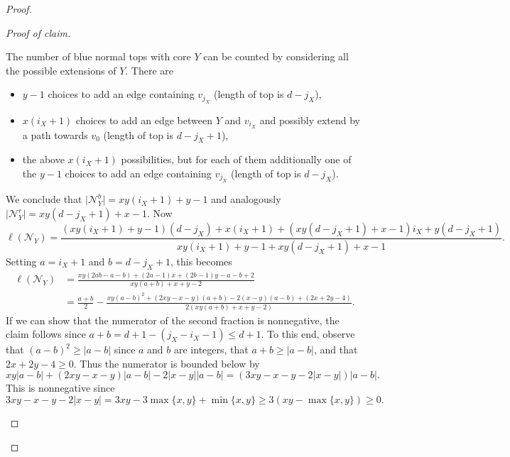 \documentclass[11pt]{article}
\theoremstyle{definition}
\newcommand{\ny}{\mathcal N_{Y}}
\newcommand*{\abs}[1]{\lvert #1\rvert}
\newenvironment{poc}{\begin{proof}[Proof of claim]\renewcommand*{\qedsymbol}{$\blacksquare$}}{\end{proof}}
\begin{document}
\begin{proof}
\begin{poc}
\begin{itemize}
            The number of blue normal tops with core $Y$ can be counted by considering all the possible extensions of $Y$. There are 
            \begin{itemize}
                \item $y-1$ choices to add an edge containing $v_{j_X}$ (length of top is $d-j_X$),
                \item $x(i_X+1)$ choices to add an edge between $Y$ and $v_{i_X}$ and possibly extend by a path towards $v_0$ (length of top is $d-j_X+1$),
                \item the above $x(i_X+1)$ possibilities, but for each of them additionally one of the $y-1$ choices to add an edge containing $v_{j_X}$ (length of top is $d-j_X$).
            \end{itemize}
            We conclude that $\abs{\ny^b}=xy(i_X+1)+y-1$ and analogously $\abs{\ny^r}=xy(d-j_X+1)+x-1$.
            Now
            $$\ell(\ny) = \frac{(xy(i_X+1)+y-1)(d-j_X)+x(i_X+1)+ (xy(d-j_X+1)+x-1)i_X+y(d-j_X+1) }{xy(i_X+1)+y-1+xy(d-j_X+1)+x-1}.$$
            Setting $a = i_X+1$ and $b = d-j_X+1$, this becomes
        \begin{align*}
        \ell(\ny) &= \frac{xy(2ab-a-b)+(2a-1)x+(2b-1)y-a-b+2}{xy(a+b)+x+y-2} \\
        &= \frac{a+b}{2} - \frac{xy(a-b)^2 + (2xy-x-y)(a+b)-2(x-y)(a-b)+(2x+2y-4)}{2(xy(a+b)+x+y-2)}.
        \end{align*}
If we can show that the numerator of the second fraction is nonnegative, the claim follows since $a+b = d+1 - (j_X-i_X-1) \le d+1$. To this end, observe that $(a-b)^2 \ge \abs{a-b}$ since $a$ and $b$ are integers, that $a+b \ge \abs{a-b}$, and that $2x+2y-4 \ge 0$. Thus the numerator is bounded below by
$$xy\abs{a-b} + (2xy-x-y)\abs{a-b} - 2\abs{x-y}\abs{a-b} = (3xy-x-y-2\abs{x-y})\abs{a-b}.$$
This is nonnegative since
$$3xy-x-y-2\abs{x-y} = 3xy - 3\max\{x,y\} +\min\{x,y\} \ge
3(xy - \max\{x,y\}) \ge 0.$$



\end{itemize}
\end{poc}
\end{proof}
\end{document}
